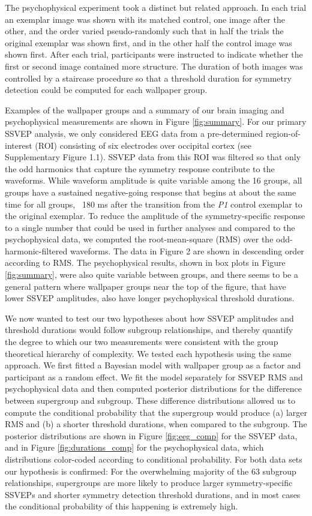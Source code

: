 \documentclass[11pt, twoside]{article}
\begin{document}
The psychophysical experiment took a distinct but related approach. In each trial an exemplar image was shown with its matched control, one image after the other, and the order varied pseudo-randomly such that in half the trials the original exemplar was shown first, and in the other half the control image was shown first. After each trial, participants were instructed to indicate whether the first or second image contained more structure. The duration of both images was controlled by a staircase procedure so that a threshold duration for symmetry detection could be computed for each wallpaper group. 

Examples of the wallpaper groups and a summary of our brain imaging and psychophysical measurements are shown in Figure \ref{fig:summary}. For our primary SSVEP analysis, we only considered EEG data from a pre-determined region-of-interest (ROI) consisting of six electrodes over occipital cortex (see Supplementary Figure 1.1). SSVEP data from this ROI was filtered so that only the odd harmonics that capture the symmetry response contribute to the waveforms. While waveform amplitude is quite variable among the 16 groups, all groups have a sustained negative-going response that begins at about the same time for all groups, ~180 ms after the transition from the \textit{P1} control exemplar to the original exemplar. To reduce the amplitude of the symmetry-specific response to a single number that could be used in further analyses and compared to the psychophysical data, we computed the root-mean-square (RMS) over the odd-harmonic-filtered waveforms. The data in Figure 2 are shown in descending order according to RMS. The psychophysical results, shown in box plots in Figure \ref{fig:summary}, were also quite variable between groups, and there seems to be a general pattern where wallpaper groups near the top of the figure, that have lower SSVEP amplitudes, also have longer psychophysical threshold durations. 

We now wanted to test our two hypotheses about how SSVEP amplitudes and threshold durations would follow subgroup relationships, and thereby quantify the degree to which our two measurements were consistent with the group theoretical hierarchy of complexity. We tested each hypothesis using the same approach. We first fitted a Bayesian model with wallpaper group as a factor and participant as a random effect. We fit the model separately for SSVEP RMS and psychophysical data and then computed posterior distributions for the difference between supergroup and subgroup. These difference distributions allowed us to compute the conditional probability that the supergroup would produce (a) larger RMS and (b) a shorter threshold durations, when compared to the subgroup. The posterior distributions are shown in Figure \ref{fig:eeg_comp} for the SSVEP data, and in Figure \ref{fig:durations_comp} for the psychophysical data, which distributions color-coded according to conditional probability. For both data sets our hypothesis is confirmed: For the overwhelming majority of the 63 subgroup relationships, supergroups are more likely to produce larger symmetry-specific SSVEPs and shorter symmetry detection threshold durations, and in most cases the conditional probability of this happening is extremely high. 
\end{document}
